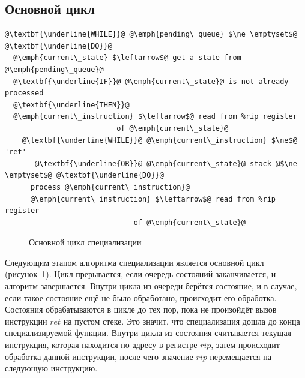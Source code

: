 \subsection{Основной цикл}
\newsavebox\boxzero
\begin{lrbox}{\boxzero}
\begin{lstlisting}[xleftmargin = 20pt]
@\textbf{\underline{WHILE}}@ @\emph{pending\_queue} $\ne \emptyset$@ @\textbf{\underline{DO}}@
  @\emph{current\_state} $\leftarrow$@ get a state from @\emph{pending\_queue}@
  @\textbf{\underline{IF}}@ @\emph{current\_state}@ is not already processed
  @\textbf{\underline{THEN}}@
  @\emph{current\_instruction} $\leftarrow$@ read from %rip register
                          of @\emph{current\_state}@
    @\textbf{\underline{WHILE}}@ @\emph{current\_instruction} $\ne$@ 'ret'
       @\textbf{\underline{OR}}@ @\emph{current\_state}@ stack @$\ne \emptyset$@ @\textbf{\underline{DO}}@
      process @\emph{current\_instruction}@
      @\emph{current\_instruction} $\leftarrow$@ read from %rip register
                              of @\emph{current\_state}@
\end{lstlisting}
\end{lrbox}
\begin{figure}[!t]
\hspace{1cm}
\subfloat{\usebox\boxzero}
\caption{Основной цикл специализации\label{fig:cycle}}
\end{figure}
Следующим этапом алгоритма специализации является основной цикл (рисунок~\ref{fig:cycle}).
Цикл прерывается, если очередь состояний заканчивается, и алгоритм завершается.
Внутри цикла из очереди берётся состояние, и в случае, если такое состояние ещё не было обработано, происходит его обработка.
Состояния обрабатываются в цикле до тех пор, пока не произойдёт вызов инструкции $ret$ на пустом стеке.
Это значит, что специализация дошла до конца специализируемой функции. Внутри цикла из состояния считывается текущая инструкция, которая находится по адресу в регистре $rip$, затем происходит обработка данной инструкции, после чего значение $rip$ перемещается на следующую инструкцию.


